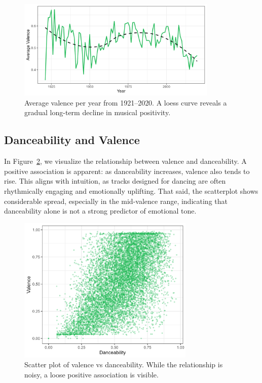 \documentclass[a4paper,11pt]{article}
\begin{document}
\begin{figure}[h]
\centering
\includegraphics[width=0.85\textwidth]{Figure2-valence-trend-year.png}
\caption{Average valence per year from 1921–2020. A loess curve reveals a gradual long-term decline in musical positivity.}
\label{fig:valence_trend}
\end{figure}

\subsection{Danceability and Valence}
In Figure~\ref{fig:scatter_dance}, we visualize the relationship between valence and danceability. A positive association is apparent: as danceability increases, valence also tends to rise. This aligns with intuition, as tracks designed for dancing are often rhythmically engaging and emotionally uplifting. That said, the scatterplot shows considerable spread, especially in the mid-valence range, indicating that danceability alone is not a strong predictor of emotional tone.

\begin{figure}[h]
\centering
\includegraphics[width=0.75\textwidth]{Figure3-scatter-danceability-valence.png}
\caption{Scatter plot of valence vs danceability. While the relationship is noisy, a loose positive association is visible.}
\label{fig:scatter_dance}
\end{figure}
\end{document}
